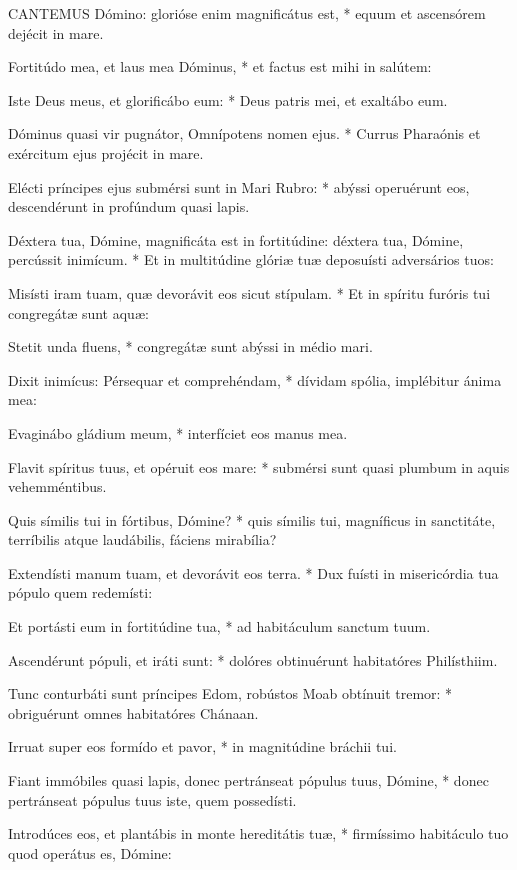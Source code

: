 
\lettrine[lines=2]{C}{ANTEMUS} Dómino: glorióse enim magnificátus est, * equum et ascensórem dejécit in mare.

Fortitúdo mea, et laus mea Dóminus, * et factus est mihi in salútem:

Iste Deus meus, et glorificábo eum: * Deus patris mei, et exaltábo eum.

Dóminus quasi vir pugnátor, Omnípotens nomen ejus. * Currus Pharaónis et exércitum ejus projécit in mare.

Elécti príncipes ejus submérsi sunt in Mari Rubro: * abýssi operuérunt eos, descendérunt in profúndum quasi lapis.

Déxtera tua, Dómine, magnificáta est in fortitúdine: déxtera tua, Dómine, percússit inimícum. * Et in multitúdine glóriæ tuæ deposuísti adversários tuos:

Misísti iram tuam, quæ devorávit eos sicut stípulam. * Et in spíritu furóris tui congregátæ sunt aquæ:

Stetit unda fluens, * congregátæ sunt abýssi in médio mari.

Dixit inimícus: Pérsequar et comprehéndam, * dívidam spólia, implébitur ánima mea:

Evaginábo gládium meum, * interfíciet eos manus mea.

Flavit spíritus tuus, et opéruit eos mare: * submérsi sunt quasi plumbum in aquis vehemméntibus.

Quis símilis tui in fórtibus, Dómine? * quis símilis tui, magníficus in sanctitáte, terríbilis atque laudábilis, fáciens mirabília?

Extendísti manum tuam, et devorávit eos terra. * Dux fuísti in misericórdia tua pópulo quem redemísti:

Et portásti eum in fortitúdine tua, * ad habitáculum sanctum tuum.

Ascendérunt pópuli, et iráti sunt: * dolóres obtinuérunt habitatóres Philísthiim.

Tunc conturbáti sunt príncipes Edom, robústos Moab obtínuit tremor: * obriguérunt omnes habitatóres Chánaan.

Irruat super eos formído et pavor, * in magnitúdine bráchii tui.

Fiant immóbiles quasi lapis, donec pertránseat pópulus tuus, Dómine, * donec pertránseat pópulus tuus iste, quem possedísti.

Introdúces eos, et plantábis in monte hereditátis tuæ, * firmíssimo habitáculo tuo quod operátus es, Dómine:

